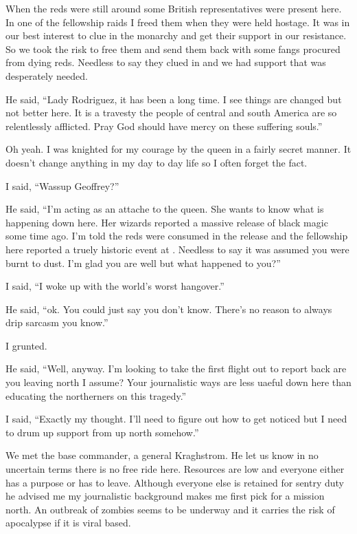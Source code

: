 When the reds were still around some British representatives were present here. In one of the fellowship raids I freed them when they were held hostage. It was in our best interest to clue in the monarchy and get their support in our resistance. So we took the risk to free them and send them back with some fangs procured from dying reds. Needless to say they clued in and we had support that was desperately needed.

He said, ``Lady Rodriguez, it has been a long time. I see things are changed but not better here. It is a travesty the people of central and south America are so relentlessly afflicted. Pray God should have mercy on these suffering souls.''

Oh yeah. I was knighted for my courage by the queen in a fairly secret manner. It doesn't change anything in my day to day life so I often forget the fact.

I said, ``Wassup Geoffrey?''

He said, ``I'm acting as an attache to the queen. She wants to know what is happening down here. Her wizards reported a massive release of black magic some time ago. I'm told the reds were consumed in the release and the fellowship here reported a truely historic event at \chichenitza{}. Needless to say it was assumed you were burnt to dust. I'm glad you are well but what happened to you?''

I said, ``I woke up with the world's worst hangover.''

He said, ``ok. You could just say you don't know. There's no reason to always drip sarcasm you know.''

I grunted.

He said, ``Well, anyway. I'm looking to take the first flight out to report back are you leaving north I assume? Your journalistic ways are less uaeful down here than educating the northerners on this tragedy.''

I said, ``Exactly my thought. I'll need to figure out how to get noticed but I need to drum up support from up north somehow.''

We met the base commander, a general Kraghstrom. He let us know in no uncertain terms there is no free ride here. Resources are low and everyone either has a purpose or has to leave. Although everyone else is retained for sentry duty he advised me my journalistic background makes me first pick for a mission north. An outbreak of zombies seems to be underway and it carries the risk of apocalypse if it is viral based.

